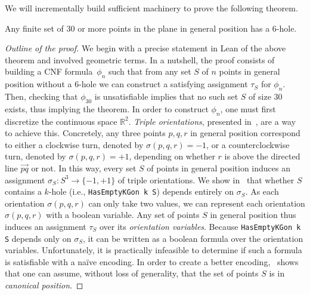 We will incrementally build sufficient machinery to prove the following theorem.

\begin{theorem*}
Any finite set of $30$ or more points in the plane in general position has a $6$-hole.
\end{theorem*}

\begin{proof}[Outline of the proof]
We begin  with a precise statement in Lean of the above theorem and involved geometric terms.
In a nutshell, the proof consists of building a CNF formula~$\phi_n$ such that 
from any set $S$ of $n$ points in general position without a $6$-hole we can construct a satisfying assignment $\tau_S$ for $\phi_n$.
Then, checking that $\phi_{30}$ is unsatisfiable implies that no such set $S$ of size $30$ exists, thus implying the theorem. 
% 
In order to construct $\phi_n$, one must first discretize the continuous space $\mathbb{R}^2$. \emph{Triple orientations}, presented in~, are a way to achieve this. Concretely, any three points $p,q,r$ in general position correspond to either a clockwise turn, denoted by $\sigma(p, q, r) = -1$, or a counterclockwise turn, denoted by $\sigma(p, q, r) = +1$, depending on whether $r$ is above the directed line $\overrightarrow{pq}$ or not. 
In this way, every set $S$ of points in general position induces an assignment $\sigma_S: S^3 \to \{-1,+1\}$
of triple orientations.
We show in~ that whether $S$ contains a $k$-hole (i.e., \lstinline|HasEmptyKGon k S|) depends entirely on $\sigma_S$. 
As each orientation $\sigma(p, q, r)$ can only take two values, we can represent each orientation $\sigma(p,q,r)$ with a boolean variable. Any set of points $S$ in general position thus induces an assignment $\tau_S$ over its \emph{orientation variables}. 
Because \lstinline|HasEmptyKGon k S| depends only on $\sigma_S$, it can be written as a boolean formula over the orientation variables.
% 
Unfortunately, it is practically infeasible to determine if such a formula is satisfiable with a naïve encoding.
In order to create a better encoding,~ shows that one can assume, without loss of generality, that the set of points $S$ is in \emph{canonical position}.

\end{proof}
